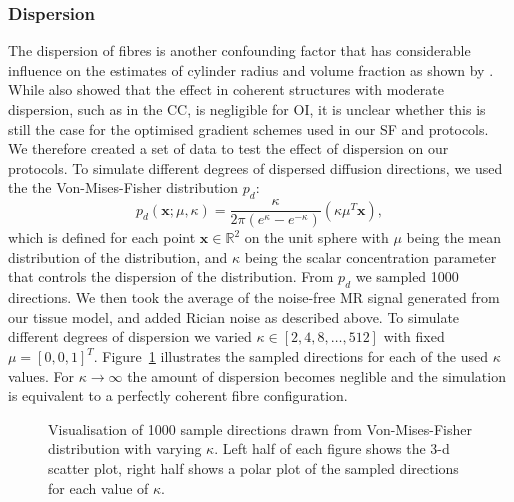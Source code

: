 \subsubsection{Dispersion}
The dispersion of fibres is another confounding factor that has considerable influence on the estimates of cylinder radius and volume fraction as shown by \citet{Zhang:2011}. While \citeauthor{Zhang:2011} also showed that the effect in coherent structures with moderate dispersion, such as in the CC, is negligible for {\gls{OI}}, it is unclear whether this is still the case for the optimised gradient schemes used in our {\gls{SF}} and {\DO} protocols. We therefore created a set of data to test the effect of dispersion on our protocols. To simulate different degrees of dispersed diffusion directions, we used the the Von-Mises-Fisher distribution $p_{d}$:
\begin{equation}
	p_{d}(\mathbf{x}; \mu, \kappa)=\frac {\kappa} {2\pi(e^{\kappa}-e^{-\kappa})} \left( {\kappa \mu^T \mathbf{x} } \right),
\end{equation}
which is defined for each point $\mathbf{x} \in \mathbb{R}^2$ on the unit sphere with $\mu$ being the mean distribution of the distribution, and $\kappa$ being the scalar concentration parameter that controls the dispersion of the distribution. From $p_d$ we sampled 1000 directions. We then took the average of the noise-free MR signal generated from our tissue model, and added Rician noise as described above. To simulate different degrees of dispersion we varied $\kappa \in [2,4,8,\dots,512]$ with fixed $\mu=[0,0,1]^T$. Figure~\ref{fig:chapter7 exp1 VanMises draw} illustrates the sampled directions for each of the used $\kappa$ values. For $\kappa\rightarrow\infty$ the amount of dispersion becomes neglible and the simulation is equivalent to a perfectly coherent fibre configuration.

\bgroup
\tikzset{use png}
\begin{figure}[h]
    \centering 	
	 \caption{Visualisation of 1000 sample directions drawn from Von-Mises-Fisher distribution with varying $\kappa$. Left half of each figure shows the 3-d scatter plot, right half shows a polar plot of the sampled directions for each value of $\kappa$.}
  \label{fig:chapter7 exp1 VanMises draw}
 \end{figure}
\egroup
